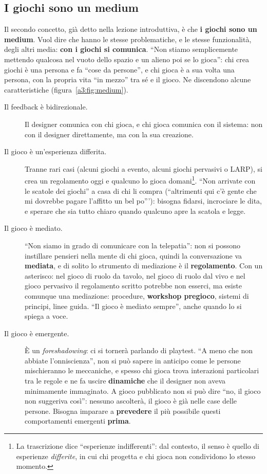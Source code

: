 \subsection{I giochi sono un medium}

Il secondo concetto, già detto nella lezione introduttiva, è che \textbf{i
giochi sono un medium}. Vuol dire che hanno le stesse problematiche, e le stesse
funzionalità, degli altri media: \textbf{con i giochi si comunica}. ``Non stiamo
semplicemente mettendo qualcosa nel vuoto dello spazio e un alieno poi se lo
gioca'': chi crea giochi è una persona e fa ``cose da persone'', e chi gioca è a
sua volta una persona, con la propria vita ``in mezzo'' tra sé e il gioco. Ne
discendono alcune caratteristiche (figura~\ref{a3:fig:medium}).

\begin{description}
  \item[Il feedback è bidirezionale.] Il designer comunica con chi gioca, e chi
        gioca comunica con il sistema: non con il designer direttamente, ma con
        la sua creazione.
  \item[Il gioco è un'esperienza differita.] Tranne rari casi (alcuni giochi a
        evento, alcuni giochi pervasivi o LARP), si crea un regolamento oggi e
        qualcuno lo gioca domani\footnote{La trascrizione dice ``esperienze
        indifferenti'': dal contesto, il senso è quello di esperienze
        \emph{differite}, in cui chi progetta e chi gioca non condividono lo
        stesso momento.}. ``Non arrivate con le scatole dei giochi'' a casa di
        chi li compra (``altrimenti qui c'è gente che mi dovrebbe pagare
        l'affitto un bel po'''): bisogna fidarsi, incrociare le dita, e sperare
        che sia tutto chiaro quando qualcuno apre la scatola e legge.
  \item[Il gioco è mediato.] ``Non siamo in grado di comunicare con la
        telepatia'': non si possono instillare pensieri nella mente di chi gioca,
        quindi la conversazione va \textbf{mediata}, e di solito lo strumento
        di mediazione è il \textbf{regolamento}. Con un asterisco: nel gioco di
        ruolo da tavolo, nel gioco di ruolo dal vivo e nel gioco pervasivo il
        regolamento scritto potrebbe non esserci, ma esiste comunque una
        mediazione: procedure, \textbf{workshop pregioco}, sistemi di principi,
        linee guida. ``Il gioco è mediato sempre'', anche quando lo si spiega a
        voce.
  \item[Il gioco è emergente.] È un \emph{foreshadowing}: ci si tornerà
        parlando di playtest. ``A meno che non abbiate l'onniscienza'', non si
        può sapere in anticipo come le persone mischieranno le meccaniche, e
        spesso chi gioca trova interazioni particolari tra le regole e ne fa
        uscire \textbf{dinamiche} che il designer non aveva minimamente
        immaginato. A gioco pubblicato non si può dire ``no, il gioco non
        suggeriva così'': nessuno ascolterà, il gioco è già nelle case delle
        persone. Bisogna imparare a \textbf{prevedere} il più possibile questi
        comportamenti emergenti \textbf{prima}.
\end{description}

